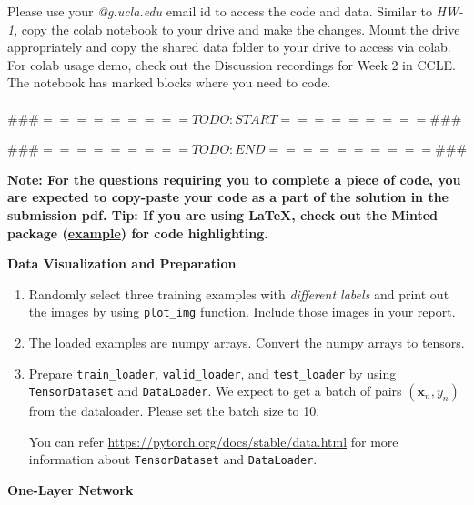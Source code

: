\documentclass[11pt]{article}
\begin{document}
Please use your \textit{@g.ucla.edu} email id to access the code and data. Similar to \textit{HW-1}, copy the colab notebook to your drive and make the changes. Mount the drive appropriately and copy the shared data folder to your drive to access via colab. For colab usage demo, check out the Discussion recordings for Week 2 in CCLE. 
The notebook has marked blocks where you need to code. \\
\\
 $\#\#\# ========= TODO  : START ========= \#\#\#$
 
 $\#\#\# ========= TODO :  END   ========== \#\#\#$

\textbf{Note: For the questions requiring you to complete a piece of code, you are expected to {\color{red}copy-paste your code as a part of the solution} in the submission pdf. Tip: If you are using \LaTeX, check out the Minted package (\href{https://www.overleaf.com/learn/latex/Code_Highlighting_with_minted}{example}) for code highlighting.} 

\vspace{10pt} {\large \textbf{Data Visualization and Preparation}
}
\begin{enumerate}
\item Randomly select three training examples with \emph{different labels} and print out the images by using \verb|plot_img| function. Include those images in your report. 

\solution{}

\item The loaded examples are numpy arrays. Convert the numpy arrays to tensors. 

\solution{}

\item Prepare \verb|train_loader|, \verb|valid_loader|, and \verb|test_loader| by using \verb|TensorDataset| and \verb|DataLoader|. We expect to get a batch of pairs $(\mathbf{x}_n, y_n)$ from the dataloader. Please set the batch size to 10. 

You can refer \url{https://pytorch.org/docs/stable/data.html} for more information about \verb|TensorDataset| and \verb|DataLoader|.

\solution{}
\end{enumerate}



\vspace{10pt} {\large \textbf{One-Layer Network} }
\end{document}
